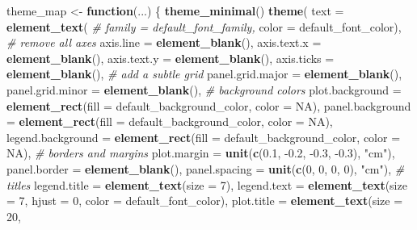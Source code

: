 \documentclass[
]{article}
\newenvironment{Shaded}{\begin{snugshade}}{\end{snugshade}}
\newcommand{\CommentTok}[1]{\textcolor[rgb]{0.56,0.35,0.01}{\textit{#1}}}
\newcommand{\ControlFlowTok}[1]{\textcolor[rgb]{0.13,0.29,0.53}{\textbf{#1}}}
\newcommand{\DataTypeTok}[1]{\textcolor[rgb]{0.13,0.29,0.53}{#1}}
\newcommand{\DecValTok}[1]{\textcolor[rgb]{0.00,0.00,0.81}{#1}}
\newcommand{\FloatTok}[1]{\textcolor[rgb]{0.00,0.00,0.81}{#1}}
\newcommand{\KeywordTok}[1]{\textcolor[rgb]{0.13,0.29,0.53}{\textbf{#1}}}
\newcommand{\NormalTok}[1]{#1}
\newcommand{\OtherTok}[1]{\textcolor[rgb]{0.56,0.35,0.01}{#1}}
\newcommand{\StringTok}[1]{\textcolor[rgb]{0.31,0.60,0.02}{#1}}
\begin{document}
\begin{Shaded}
\begin{Highlighting}[]
\NormalTok{theme_map <-}\StringTok{ }\ControlFlowTok{function}\NormalTok{(...) \{}
  \KeywordTok{theme_minimal}\NormalTok{()}
  \KeywordTok{theme}\NormalTok{(}
    \DataTypeTok{text =} \KeywordTok{element_text}\NormalTok{(}
      \CommentTok{# family = default_font_family,}
      \DataTypeTok{color =}\NormalTok{ default_font_color),}
    \CommentTok{# remove all axes}
    \DataTypeTok{axis.line =} \KeywordTok{element_blank}\NormalTok{(),}
    \DataTypeTok{axis.text.x =} \KeywordTok{element_blank}\NormalTok{(),}
    \DataTypeTok{axis.text.y =} \KeywordTok{element_blank}\NormalTok{(),}
    \DataTypeTok{axis.ticks =} \KeywordTok{element_blank}\NormalTok{(),}
    \CommentTok{# add a subtle grid}
    \DataTypeTok{panel.grid.major =} \KeywordTok{element_blank}\NormalTok{(),}
    \DataTypeTok{panel.grid.minor =} \KeywordTok{element_blank}\NormalTok{(),}
    \CommentTok{# background colors}
    \DataTypeTok{plot.background =} \KeywordTok{element_rect}\NormalTok{(}\DataTypeTok{fill =}\NormalTok{ default_background_color,}
                                   \DataTypeTok{color =} \OtherTok{NA}\NormalTok{),}
    \DataTypeTok{panel.background =} \KeywordTok{element_rect}\NormalTok{(}\DataTypeTok{fill =}\NormalTok{ default_background_color,}
                                    \DataTypeTok{color =} \OtherTok{NA}\NormalTok{),}
    \DataTypeTok{legend.background =} \KeywordTok{element_rect}\NormalTok{(}\DataTypeTok{fill =}\NormalTok{ default_background_color,}
                                     \DataTypeTok{color =} \OtherTok{NA}\NormalTok{),}
    \CommentTok{# borders and margins}
    \DataTypeTok{plot.margin =} \KeywordTok{unit}\NormalTok{(}\KeywordTok{c}\NormalTok{(}\FloatTok{0.1}\NormalTok{, }\FloatTok{-0.2}\NormalTok{, }\FloatTok{-0.3}\NormalTok{, }\FloatTok{-0.3}\NormalTok{), }\StringTok{"cm"}\NormalTok{),}
    \DataTypeTok{panel.border =} \KeywordTok{element_blank}\NormalTok{(),}
    \DataTypeTok{panel.spacing =} \KeywordTok{unit}\NormalTok{(}\KeywordTok{c}\NormalTok{(}\DecValTok{0}\NormalTok{, }\DecValTok{0}\NormalTok{, }\DecValTok{0}\NormalTok{, }\DecValTok{0}\NormalTok{), }\StringTok{"cm"}\NormalTok{),}
    \CommentTok{# titles}
    \DataTypeTok{legend.title =} \KeywordTok{element_text}\NormalTok{(}\DataTypeTok{size =} \DecValTok{7}\NormalTok{),}
    \DataTypeTok{legend.text =} \KeywordTok{element_text}\NormalTok{(}\DataTypeTok{size =} \DecValTok{7}\NormalTok{, }\DataTypeTok{hjust =} \DecValTok{0}\NormalTok{,}
                               \DataTypeTok{color =}\NormalTok{ default_font_color),}
    \DataTypeTok{plot.title =} \KeywordTok{element_text}\NormalTok{(}\DataTypeTok{size =} \DecValTok{20}\NormalTok{, }

\end{Highlighting}
\end{Shaded}
\end{document}
